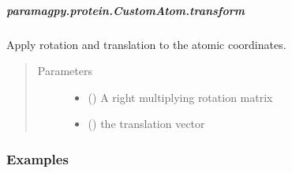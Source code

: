 \documentclass[a4paper,10pt,english,openany,oneside]{sphinxmanual}
\begin{document}
\begin{fulllineitems}
\begin{fulllineitems}
\begin{fulllineitems}
\label{\detokenize{reference/generated/paramagpy.protein.CustomAtom.top:paramagpy.protein.CustomAtom.top}}
\end{fulllineitems}



\subparagraph{paramagpy.protein.CustomAtom.transform}
\label{\detokenize{reference/generated/paramagpy.protein.CustomAtom.transform:paramagpy-protein-customatom-transform}}\label{\detokenize{reference/generated/paramagpy.protein.CustomAtom.transform::doc}}

\begin{fulllineitems}
\label{\detokenize{reference/generated/paramagpy.protein.CustomAtom.transform:paramagpy.protein.CustomAtom.transform}}
Apply rotation and translation to the atomic coordinates.
\begin{quote}\begin{description}
\item[{Parameters}] \leavevmode\begin{itemize}
\item {} 
 () \textendash{} A right multiplying rotation matrix

\item {} 
 () \textendash{} the translation vector

\end{itemize}

\end{description}\end{quote}
\subsubsection*{Examples}

%
\begin{sphinxVerbatim}[commandchars=\\\{\}]
   
   
 
\end{sphinxVerbatim}


\end{fulllineitems}
\end{fulllineitems}
\end{fulllineitems}
\end{document}
